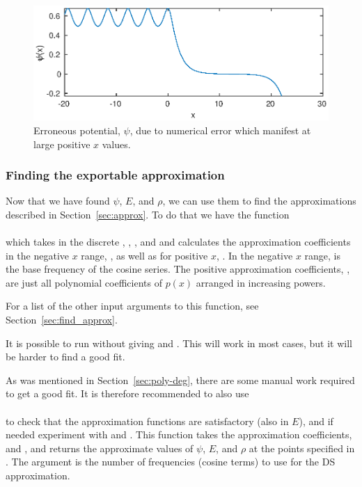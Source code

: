 \documentclass[11pt,a4paper, 
swedish, english %
]{article}
\begin{document}
\begin{figure}
\centering
\includegraphics{Sh_M1-300_tau200_too-large-range.eps}
\caption{Erroneous potential, $\psi$, due to numerical error which
  manifest at large positive $x$ values.}
\label{fig:too-large-range}
\end{figure}

\subsubsection{Finding the exportable approximation}
Now that we have found $\psi$, $E$, and $\rho$, we can use them to find
the approximations described in Section~\ref{sec:approx}. To do that
we have the function\\
\indent{}\\
which takes in the discrete , , , and
 and calculates the approximation coefficients in the
negative $x$ range, , as well as for positive $x$,
. In the negative $x$ range,  is the base frequency
of the cosine series. The positive approximation coefficients,
, are just all polynomial coefficients of $p(x)$ arranged in
increasing powers.

For a list of the other input arguments to this function, see
Section~\ref{sec:find_approx}. 

It is possible to run  without giving  and
. This will work in most cases, but it will be harder to
find a good fit. 


As was mentioned in Section~\ref{sec:poly-deg}, there are some manual
work required to get a good fit. It is therefore recommended to also
use\\
\indent{}\\
to check that the approximation functions are satisfactory (also in
$E$), and if needed experiment with  and
. This function takes the approximation
coefficients,  and , and returns the approximate
values of $\psi$, $E$, and $\rho$ at the points specified in
. The argument  is the number of frequencies
(cosine terms) to use for the DS approximation.
\end{document}
